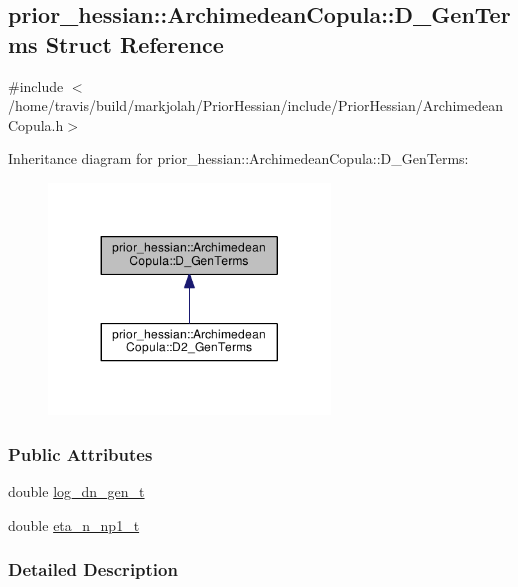 \hypertarget{structprior__hessian_1_1ArchimedeanCopula_1_1D__GenTerms}{}\subsection{prior\+\_\+hessian\+:\+:Archimedean\+Copula\+:\+:D\+\_\+\+Gen\+Terms Struct Reference}
\label{structprior__hessian_1_1ArchimedeanCopula_1_1D__GenTerms}


{\ttfamily \#include $<$/home/travis/build/markjolah/\+Prior\+Hessian/include/\+Prior\+Hessian/\+Archimedean\+Copula.\+h$>$}



Inheritance diagram for prior\+\_\+hessian\+:\+:Archimedean\+Copula\+:\+:D\+\_\+\+Gen\+Terms\+:\nopagebreak
\begin{figure}[H]
\begin{center}
\leavevmode
\includegraphics[width=212pt]{structprior__hessian_1_1ArchimedeanCopula_1_1D__GenTerms__inherit__graph}
\end{center}
\end{figure}
\subsubsection*{Public Attributes}
\begin{DoxyCompactItemize}
\item 
double \hyperlink{structprior__hessian_1_1ArchimedeanCopula_1_1D__GenTerms_a32ee7fddd5bbd1af598c8d21015c7125}{log\+\_\+dn\+\_\+gen\+\_\+t}
\item 
double \hyperlink{structprior__hessian_1_1ArchimedeanCopula_1_1D__GenTerms_a5dff2f37bb7e708a87415b0f7546eb6b}{eta\+\_\+n\+\_\+np1\+\_\+t}
\end{DoxyCompactItemize}


\subsubsection{Detailed Description}


